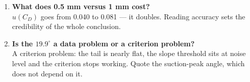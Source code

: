 \documentclass[11pt,a4paper]{article}
\newcommand{\CD}{\ensuremath{C_D}}
\begin{document}
\begin{enumerate}[leftmargin=1.6em,itemsep=4pt]
\item \textbf{What does 0.5 mm versus 1 mm cost?}\\
$u(\CD)$ goes from 0.040 to 0.081 --- it doubles. Reading accuracy sets the credibility of the whole
conclusion.

\item \textbf{Is the $19.9^\circ$ a data problem or a criterion problem?}\\
A criterion problem: the tail is nearly flat, the slope threshold sits at noise level and the
criterion stops working. Quote the suction-peak angle, which does not depend on it.
\end{enumerate}
\end{document}
